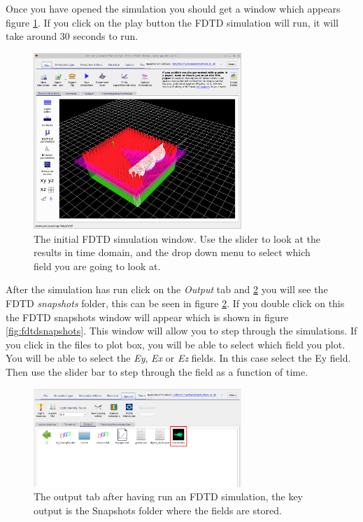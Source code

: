Once you have opened the simulation you should get a window which appears figure \ref{fig:fdtdfirstwindow}. If you click on the play button the FDTD simulation will run, it will take around 30 seconds to run.

\begin{figure}[H]
\centering
\includegraphics[width=0.7\textwidth]{./images/fdtd_2.png}
\caption{The initial FDTD simulation window. Use the slider to look at the results in time domain, and the drop down menu to select which field you are going to look at.}
\label{fig:fdtdfirstwindow}
\end{figure}

After the simulation has run click on the \emph{Output} tab and \ref{fig:fdtdoutputs} you will see the FDTD \emph{snapshots} folder, this can be seen in figure \ref{fig:fdtdoutputs}.  If you double click on this the FDTD snapshots window will appear which is shown in figure \ref{fig:fdtdsnapshots}.  This window will allow you to step through the simulations. If you click in the files to plot box, you will be able to select which field you plot. You will be able to select the \emph{Ey}, \emph{Ex} or \emph{Ez} fields.  In this case select the Ey field. Then use the slider bar to step through the field as a function of time.

\begin{figure}[H]
\centering
\includegraphics[width=0.7\textwidth]{./images/fdtd_8.png}
\caption{The output tab after having run an FDTD simulation, the key output is the Snapshots folder where the fields are stored.}
\label{fig:fdtdoutputs}
\end{figure}

